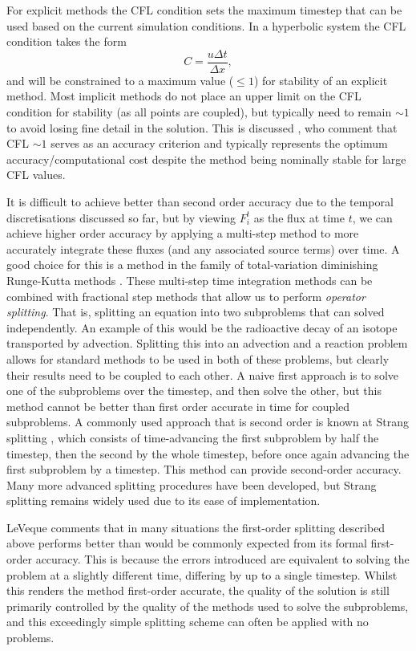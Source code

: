 For explicit methods the CFL condition sets the maximum timestep that can be used based on the current simulation conditions.
In a hyperbolic system the CFL condition takes the form
\begin{equation}
    C = \frac{u\Delta t}{\Delta x},
\end{equation}
and will be constrained to a maximum value ($\leq 1$) for stability of an explicit method.
Most implicit methods do not place an upper limit on the CFL condition for stability (as all points are coupled), but typically need to remain $\sim 1$ to avoid losing fine detail in the solution.
This is discussed \citet{Viallet2011}, who comment that CFL $\sim 1$ serves as an accuracy criterion and typically represents the optimum accuracy/computational cost despite the method being nominally stable for large CFL values.

It is difficult to achieve better than second order accuracy due to the temporal discretisations discussed so far, but by viewing $F_i^t$ as the flux at time $t$, we can achieve higher order accuracy by applying a multi-step method to more accurately integrate these fluxes (and any associated source terms) over time.
A good choice for this is a method in the family of total-variation diminishing Runge-Kutta methods \citep[e.g.][]{Shu1988}.
These multi-step time integration methods can be combined with fractional step methods that allow us to perform \emph{operator splitting}.
That is, splitting an equation into two subproblems that can solved independently.
An example of this would be the radioactive decay of an isotope transported by advection.
Splitting this into an advection and a reaction problem allows for standard methods to be used in both of these problems, but clearly their results need to be coupled to each other.
A naive first approach is to solve one of the subproblems over the timestep, and then solve the other, but this method cannot be better than first order accurate in time for coupled subproblems.
A commonly used approach that is second order is known at Strang splitting \citep{Strang1968}, which consists of time-advancing the first subproblem by half the timestep, then the second by the whole timestep, before once again advancing the first subproblem by a timestep.
This method can provide second-order accuracy.
Many more advanced splitting procedures have been developed, but Strang splitting remains widely used due to its ease of implementation.

LeVeque \NeedRef{} comments that in many situations the first-order splitting described above performs better than would be commonly expected from its formal first-order accuracy.
This is because the errors introduced are equivalent to solving the problem at a slightly different time, differing by up to a single timestep.
Whilst this renders the method first-order accurate, the quality of the solution is still primarily controlled by the quality of the methods used to solve the subproblems, and this exceedingly simple splitting scheme can often be applied with no problems.

